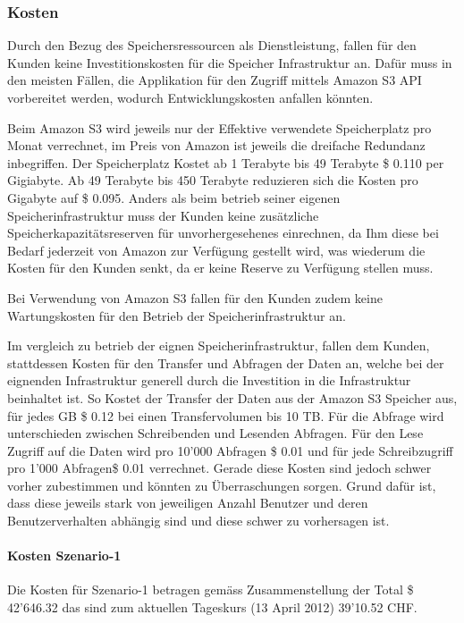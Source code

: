 \subsubsection{Kosten}
Durch den Bezug des Speichersressourcen als Dienstleistung, fallen für den Kunden keine Investitionskosten für die Speicher Infrastruktur an.
Dafür muss in den meisten Fällen, die Applikation für den Zugriff mittels Amazon S3 API vorbereitet werden, wodurch Entwicklungskosten anfallen könnten.

Beim Amazon S3 wird jeweils nur der Effektive verwendete Speicherplatz pro Monat verrechnet, im Preis von Amazon ist jeweils die dreifache Redundanz inbegriffen. Der Speicherplatz Kostet ab 1 Terabyte bis 49 Terabyte \$ 0.110 per Gigiabyte. Ab 49 Terabyte bis 450 Terabyte reduzieren sich die Kosten pro Gigabyte auf \$ 0.095. Anders als beim betrieb seiner eigenen Speicherinfrastruktur muss der Kunden keine zusätzliche Speicherkapazitätsreserven für unvorhergesehenes einrechnen, da Ihm diese bei Bedarf jederzeit von Amazon zur Verfügung gestellt wird, was wiederum die Kosten für den Kunden senkt, da er keine Reserve zu Verfügung stellen muss.

Bei Verwendung von Amazon S3 fallen für den Kunden zudem keine Wartungskosten für den Betrieb der Speicherinfrastruktur an. 

Im vergleich zu betrieb der eignen Speicherinfrastruktur, fallen dem Kunden, stattdessen Kosten für den Transfer und Abfragen der Daten an, welche bei der eignenden Infrastruktur generell durch die Investition in die Infrastruktur beinhaltet ist. So Kostet der Transfer der Daten aus der Amazon S3 Speicher aus, für jedes GB \$ 0.12 bei einen Transfervolumen bis 10 TB.  Für die Abfrage wird unterschieden zwischen Schreibenden und Lesenden Abfragen. Für den Lese Zugriff auf die Daten wird pro 10'000 Abfragen \$ 0.01 und für jede Schreibzugriff pro 1'000 Abfragen\$ 0.01 verrechnet. Gerade diese Kosten sind jedoch schwer vorher zubestimmen und könnten zu Überraschungen sorgen. Grund dafür ist, dass diese jeweils stark von jeweiligen Anzahl Benutzer und deren Benutzerverhalten abhängig sind und diese schwer zu vorhersagen ist.

\paragraph*{Kosten Szenario-1}
Die Kosten für Szenario-1 betragen gemäss Zusammenstellung der Total  \$ 42'646.32 das sind zum aktuellen Tageskurs (13 April 2012)  39'10.52 CHF. 


